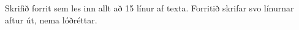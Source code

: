 \begin{problem}
	Skrifið forrit sem les inn allt að 15 línur af texta. Forritið skrifar svo línurnar aftur út, nema lóðréttar.

\begin{example}
%
\end{example}
\end{problem}